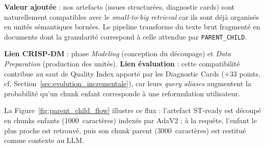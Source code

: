 \documentclass[12pt,a4paper]{report}
\begin{document}
\textbf{Valeur ajoutée} : nos artefacts (issues structurées, diagnostic cards) sont naturellement compatibles avec le \textit{small-to-big retrieval} car ils sont déjà organisés en unités sémantiques bornées. Le pipeline transforme du texte brut fragmenté en documents dont la granularité correspond à celle attendue par \texttt{PARENT\_CHILD}.

\textbf{Lien CRISP-DM} : phase \textit{Modeling} (conception du découpage) et \textit{Data Preparation} (production des unités). \textbf{Lien évaluation} : cette compatibilité contribue au saut de Quality Index apporté par les Diagnostic Cards ($+33$ points, cf. Section~\ref{sec:evolution_incrementale}), car leurs \textit{query aliases} augmentent la probabilité qu'un chunk enfant corresponde à une reformulation utilisateur.

La Figure~\ref{fig:parent_child_flow} illustre ce flux : l'artefact ST-ready est découpé en chunks enfants (1000~caractères) indexés par AdaV2 ; à la requête, l'enfant le plus proche est retrouvé, puis son chunk parent (3000~caractères) est restitué comme contexte au LLM.
\end{document}
